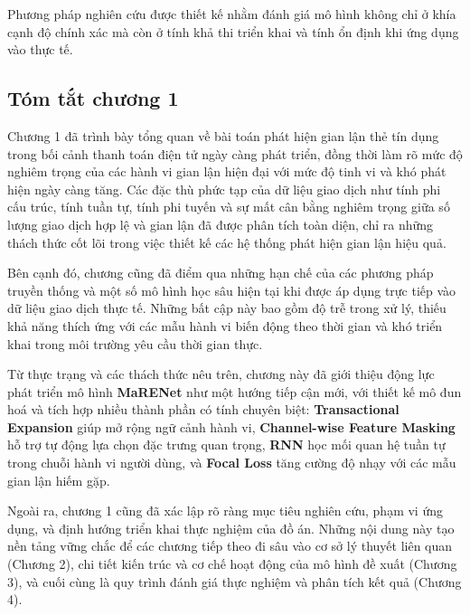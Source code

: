 Phương pháp nghiên cứu được thiết kế nhằm đánh giá mô hình không chỉ ở khía cạnh độ chính xác mà còn ở tính khả thi triển khai và tính ổn định khi ứng dụng vào thực tế.


\subsection{Tóm tắt chương 1}

Chương 1 đã trình bày tổng quan về bài toán phát hiện gian lận thẻ tín dụng trong bối cảnh thanh toán điện tử ngày càng phát triển, đồng thời làm rõ mức độ nghiêm trọng của các hành vi gian lận hiện đại với mức độ tinh vi và khó phát hiện ngày càng tăng. Các đặc thù phức tạp của dữ liệu giao dịch như tính phi cấu trúc, tính tuần tự, tính phi tuyến và sự mất cân bằng nghiêm trọng giữa số lượng giao dịch hợp lệ và gian lận đã được phân tích toàn diện, chỉ ra những thách thức cốt lõi trong việc thiết kế các hệ thống phát hiện gian lận hiệu quả.

Bên cạnh đó, chương cũng đã điểm qua những hạn chế của các phương pháp truyền thống và một số mô hình học sâu hiện tại khi được áp dụng trực tiếp vào dữ liệu giao dịch thực tế. Những bất cập này bao gồm độ trễ trong xử lý, thiếu khả năng thích ứng với các mẫu hành vi biến động theo thời gian và khó triển khai trong môi trường yêu cầu thời gian thực.

Từ thực trạng và các thách thức nêu trên, chương này đã giới thiệu động lực phát triển mô hình \textbf{MaRENet} như một hướng tiếp cận mới, với thiết kế mô đun hoá và tích hợp nhiều thành phần có tính chuyên biệt: \textbf{Transactional Expansion} giúp mở rộng ngữ cảnh hành vi, \textbf{Channel-wise Feature Masking} hỗ trợ tự động lựa chọn đặc trưng quan trọng, \textbf{RNN} học mối quan hệ tuần tự trong chuỗi hành vi người dùng, và \textbf{Focal Loss} tăng cường độ nhạy với các mẫu gian lận hiếm gặp.

Ngoài ra, chương 1 cũng đã xác lập rõ ràng mục tiêu nghiên cứu, phạm vi ứng dụng, và định hướng triển khai thực nghiệm của đồ án. Những nội dung này tạo nền tảng vững chắc để các chương tiếp theo đi sâu vào cơ sở lý thuyết liên quan (Chương 2), chi tiết kiến trúc và cơ chế hoạt động của mô hình đề xuất (Chương 3), và cuối cùng là quy trình đánh giá thực nghiệm và phân tích kết quả (Chương 4).